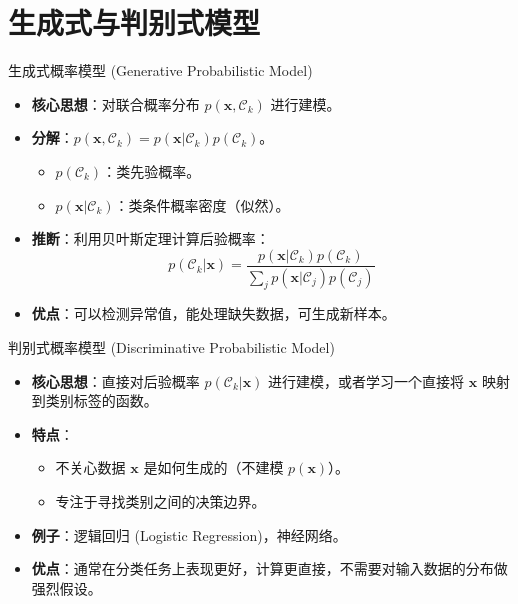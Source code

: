 \documentclass[12pt, aspectratio=169]{beamer}
\newcommand{\vect}[1]{\mathbf{#1}}
\begin{document}
\section{生成式与判别式模型}

\begin{frame}{生成式概率模型 (Generative Probabilistic Model)}
    \begin{itemize}
        \item \textbf{核心思想}：对联合概率分布 $p(\vect{x}, \mathcal{C}_k)$ 进行建模。
        \item \textbf{分解}：$p(\vect{x}, \mathcal{C}_k) = p(\vect{x}|\mathcal{C}_k)p(\mathcal{C}_k)$。
        \begin{itemize}
            \item $p(\mathcal{C}_k)$：类先验概率。
            \item $p(\vect{x}|\mathcal{C}_k)$：类条件概率密度（似然）。
        \end{itemize}
        \item \textbf{推断}：利用贝叶斯定理计算后验概率：
        $$ p(\mathcal{C}_k|\vect{x}) = \frac{p(\vect{x}|\mathcal{C}_k)p(\mathcal{C}_k)}{\sum_j p(\vect{x}|\mathcal{C}_j)p(\mathcal{C}_j)} $$
        \item \textbf{优点}：可以检测异常值，能处理缺失数据，可生成新样本。
    \end{itemize}
\end{frame}

\begin{frame}{判别式概率模型 (Discriminative Probabilistic Model)}
    \begin{itemize}
        \item \textbf{核心思想}：直接对后验概率 $p(\mathcal{C}_k|\vect{x})$ 进行建模，或者学习一个直接将 $\vect{x}$ 映射到类别标签的函数。
        \item \textbf{特点}：
        \begin{itemize}
            \item 不关心数据 $\vect{x}$ 是如何生成的（不建模 $p(\vect{x})$）。
            \item 专注于寻找类别之间的决策边界。
        \end{itemize}
        \item \textbf{例子}：逻辑回归 (Logistic Regression)，神经网络。
        \item \textbf{优点}：通常在分类任务上表现更好，计算更直接，不需要对输入数据的分布做强烈假设。
    \end{itemize}
\end{frame}
\end{document}
